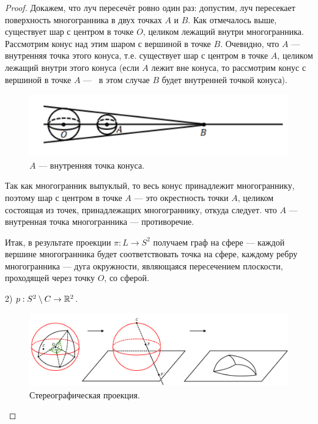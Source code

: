 \begin{proof}
    Докажем, что луч пересечёт ровно один раз: допустим, луч пересекает поверхность многогранника в двух точках $A$ и $B$. Как отмечалось выше, существует шар с центром в точке $O$, целиком лежащий внутри многогранника. Рассмотрим конус над этим шаром с вершиной в точке $B$. Очевидно, что $A$ — внутренняя точка этого конуса, т.е. существует шар с центром в точке $A$, целиком лежащий внутри этого конуса (если $A$ лежит вне конуса, то рассмотрим конус с вершиной в точке $A$ —  в этом случае $B$ будет внутренней точкой конуса).

    \begin{figure}[h]
        \centering
        \includegraphics[scale=0.8]{images/c7.3.png}
        \caption{$A$ — внутренняя точка конуса.}
        \label{fig:c7.3}
    \end{figure}

    Так как многогранник выпуклый, то весь конус принадлежит многограннику, поэтому шар с центром в точке $A$ — это окрестность точки $A$, целиком состоящая из точек, принадлежащих многограннику, откуда следует. что $A$ — внутренная точка многогранника — противоречие.

    Итак, в результате проекции $\pi: L \to S^2$ получаем граф на сфере — каждой вершине многогранника будет соответствовать точка на сфере, каждому ребру многогранника — дуга окружности, являющаяся пересечением плоскости, проходящей через точку $O$, со сферой.

    2) $p: S^2 \setminus C \to \mathbb{R}^2$.

    \begin{figure}[h]
        \centering
        \includegraphics[scale=0.5]{images/c7.4.png}
        \caption{Стереографическая проекция.}
        \label{fig:c7.4}
    \end{figure}


\end{proof}

